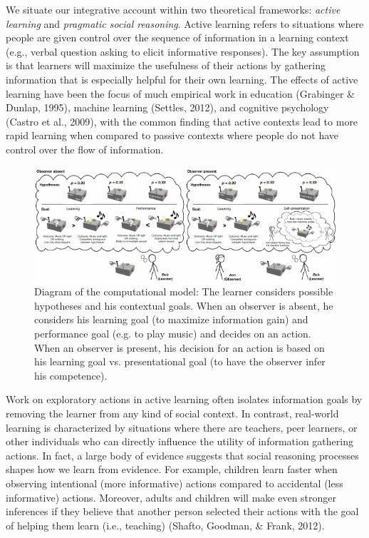 \documentclass[10pt, letterpaper]{article}
\newenvironment{CodeChunk}{}{}
\begin{document}
We situate our integrative account within two theoretical frameworks:
\emph{active learning} and \emph{pragmatic social reasoning}. Active
learning refers to situations where people are given control over the
sequence of information in a learning context (e.g., verbal question
asking to elicit informative responses). The key assumption is that
learners will maximize the usefulness of their actions by gathering
information that is especially helpful for their own learning. The
effects of active learning have been the focus of much empirical work in
education (Grabinger \& Dunlap, 1995), machine learning (Settles, 2012),
and cognitive psychology (Castro et al., 2009), with the common finding
that active contexts lead to more rapid learning when compared to
passive contexts where people do not have control over the flow of
information.

\begin{CodeChunk}
\begin{figure}[t]

{\centering \includegraphics[width=1\linewidth]{figs/model_diagram-1} 

}

\caption[Diagram of the computational model]{Diagram of the computational model: The learner considers possible hypotheses and his contextual goals. When an observer is absent, he considers his learning goal (to maximize information gain) and performance goal (e.g. to play music) and decides on an action. When an observer is present, his decision for an action is based on his learning goal vs. presentational goal (to have the observer infer his competence).}\label{fig:model_diagram}
\end{figure}
\end{CodeChunk}

Work on exploratory actions in active learning often isolates
information goals by removing the learner from any kind of social
context. In contrast, real-world learning is characterized by situations
where there are teachers, peer learners, or other individuals who can
directly influence the utility of information gathering actions. In
fact, a large body of evidence suggests that social reasoning processes
shapes how we learn from evidence. For example, children learn faster
when observing intentional (more informative) actions compared to
accidental (less informative) actions. Moreover, adults and children
will make even stronger inferences if they believe that another person
selected their actions with the goal of helping them learn (i.e.,
teaching) (Shafto, Goodman, \& Frank, 2012).
\end{document}
